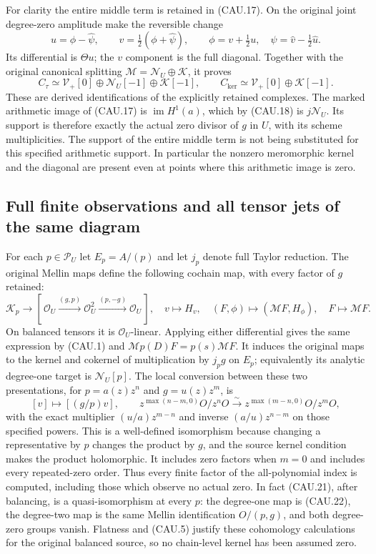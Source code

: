 For clarity the entire middle term is retained in (CAU.17).
On the original joint degree-zero amplitude make the reversible change
\[
 u=\phi-\widehat\psi,\qquad v=\tfrac12(\phi+\widehat\psi),
 \qquad\phi=v+\tfrac12u,\quad
 \psi=\widehat v-\tfrac12\widehat u.                          \tag{CAU.19}
\]
Its differential is $\Theta u$; the $v$ component is the full diagonal.
Together with the original canonical splitting
$\mathcal M=\mathcal N_U\oplus\mathcal K$, it proves
\[
 C_\tau\simeq\mathcal V_+[0]\oplus\mathcal N_U[-1]
                         \oplus\mathcal K[-1],\qquad
 C_{\ker}\simeq\mathcal V_+[0]\oplus\mathcal K[-1].           \tag{CAU.20}
\]
These are derived identifications of the explicitly retained complexes.
The marked arithmetic image of (CAU.17) is $\operatorname{im}H^1(a)$,
which by (CAU.18) is $j\mathcal N_U$.  Its support is therefore exactly
the actual zero divisor of $g$ in $U$, with its scheme multiplicities.
The support of the entire middle term is not being substituted for
this specified arithmetic support.  In particular the nonzero
meromorphic kernel and the diagonal are present even at points where
this arithmetic image is zero.

\subsection{Full finite observations and all tensor jets of the same diagram}

For each $p\in\mathcal P_U$ let $E_p=A/(p)$ and let $j_p$ denote full
Taylor reduction.  The original Mellin maps define the following
cochain map, with every factor of $g$ retained:
\[
 \mathscr K_p\longrightarrow
 [\,\mathcal O_U\xrightarrow{(g,p)}\mathcal O_U^2
                  \xrightarrow{(p,-g)}\mathcal O_U\,],
 \quad v\mapsto H_v,\quad(F,\phi)\mapsto(\mathcal MF,H_\phi),
 \quad F\mapsto\mathcal MF.                                 \tag{CAU.21}
\]
On balanced tensors it is $\mathcal O_U$-linear.  Applying either
differential gives the same expression by (CAU.1) and
$\mathcal M p(D)F=p(s)\mathcal MF$.  It induces the original maps
to the kernel and cokernel of multiplication by $j_pg$ on $E_p$;
equivalently its analytic degree-one target is $\mathcal N_U[p]$.
The local conversion between these two presentations, for
$p=a(z)z^n$ and $g=u(z)z^m$, is
\[
 [v]\longmapsto[(g/p)v],\qquad
 z^{\max(n-m,0)}O/z^nO\xrightarrow{\sim}
 z^{\max(m-n,0)}O/z^mO,                                     \tag{CAU.22}
\]
with the exact multiplier $(u/a)z^{m-n}$ and inverse
$(a/u)z^{n-m}$ on those specified powers.  This is a well-defined
isomorphism because changing a representative by $p$ changes the
product by $g$, and the source kernel condition makes the product
holomorphic.  It includes zero factors when $m=0$ and includes every
repeated-zero order.  Thus every finite factor of the all-polynomial
index is computed, including those which observe no actual zero.
In fact (CAU.21), after balancing, is a quasi-isomorphism at every
$p$: the degree-one map is (CAU.22), the degree-two map is the same
Mellin identification $O/(p,g)$, and both degree-zero groups vanish.
Flatness and (CAU.5) justify these cohomology calculations for the
original balanced source, so no chain-level kernel has been assumed zero.

